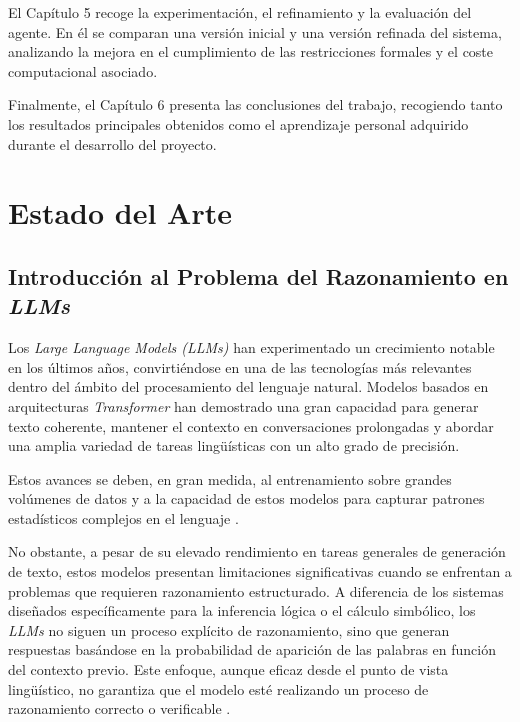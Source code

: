\documentclass[12pt,a4paper,twoside,openright]{book}
\begin{document}
El Capítulo 5 recoge la experimentación, el refinamiento y la evaluación del agente.
En él se comparan una versión inicial y una versión refinada del sistema, analizando la mejora en el cumplimiento de las restricciones formales y el coste computacional asociado.

Finalmente, el Capítulo 6 presenta las conclusiones del trabajo, recogiendo tanto los resultados principales obtenidos como el aprendizaje personal adquirido durante el desarrollo del proyecto.


\chapter{Estado del Arte}

\section{Introducción al Problema del Razonamiento en \emph{LLMs}}

Los \emph{Large Language Models (LLMs)} han experimentado un crecimiento notable en los últimos años, convirtiéndose en una de las tecnologías más relevantes dentro del ámbito del procesamiento del lenguaje natural.
Modelos basados en arquitecturas \emph{Transformer} han demostrado una gran capacidad para generar texto coherente, mantener el contexto en conversaciones prolongadas y abordar una amplia variedad de tareas lingüísticas
con un alto grado de precisión.

Estos avances se deben, en gran medida, al entrenamiento sobre grandes volúmenes de datos y a la capacidad de estos modelos para capturar patrones estadísticos complejos en el lenguaje \cite{vaswani2017attention,brown2020language}.

No obstante, a pesar de su elevado rendimiento en tareas generales de generación de texto, estos modelos presentan limitaciones significativas cuando se enfrentan a problemas que requieren razonamiento estructurado. A diferencia
de los sistemas diseñados específicamente para la inferencia lógica o el cálculo simbólico, los \emph{LLMs} no siguen un proceso explícito de razonamiento, sino que generan respuestas basándose en la probabilidad de aparición de las
palabras en función del contexto previo. Este enfoque, aunque eficaz desde el punto de vista lingüístico, no garantiza que el modelo esté realizando un proceso de razonamiento correcto o
verificable \cite{bommasani2021opportunities}.
\end{document}
